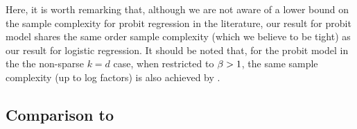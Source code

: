 Here, it is worth remarking that, although we are not aware of a lower bound on the sample complexity for probit regression in the literature, our result for probit model shares the same order sample complexity (which we believe to be tight) as our result for logistic regression.
It should be noted that, for the probit model in the the non-sparse $k=d$ case, when restricted to \(  \beta > 1  \),
the same sample complexity (up to log factors)  is also achieved by \cite{kuchelmeister2024finite}.

\subsection{Comparison to \cite{matsumoto2022binary,matsumoto2024robust}}
\label{outline:intro|>contributions|>comparison-biht}

